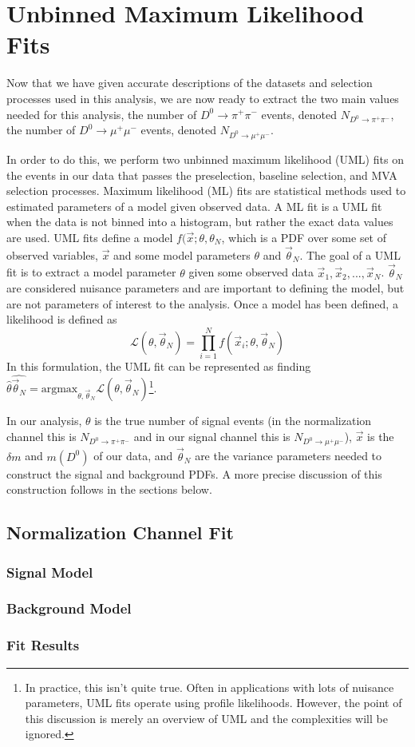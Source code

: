 \section{Unbinned Maximum Likelihood Fits}

Now that we have given accurate descriptions of the datasets and selection processes used in this analysis, we are now ready to extract the two main values needed for this analysis, the number of $D^0 \to \pi^+ \pi^-$ events, denoted $N_{D^0 \to \pi^+ \pi^-}$, the number of $D^0 \to \mu^+ \mu^-$ events, denoted $N_{D^0 \to \mu^+ \mu^-}$.

In order to do this, we perform two unbinned maximum likelihood (UML) fits on the events in our data that passes the preselection, baseline selection, and MVA selection processes. Maximum likelihood (ML) fits are statistical methods used to estimated parameters of a model given observed data. A ML fit is a UML fit when the data is not binned into a histogram, but rather the exact data values are used. UML fits define a model $f(\vec{x}; \theta, \theta_N$, which is a PDF over some set of observed variables, $\vec{x}$ and some model parameters $\theta$ and $\vec{\theta}_N$. The goal of a UML fit is to extract a model parameter $\theta$ given some observed data $\vec{x}_1, \vec{x}_2,...,\vec{x}_N$. $\vec{\theta}_N$ are considered nuisance parameters and are important to defining the model, but are not parameters of interest to the analysis. Once a model has been defined, a likelihood is defined as
\begin{equation}
    \mathcal{L}(\theta, \vec{\theta}_N) = \prod^N_{i=1} f(\vec{x}_i; \theta, \vec{\theta}_N)
\end{equation}
In this formulation, the UML fit can be represented as finding $\hat{\theta} \hat{\vec{\theta}_N}= \text{argmax}_{\theta, \vec{\theta}_N} \mathcal{L}(\theta, \vec{\theta}_N)$\footnote{In practice, this isn't quite true. Often in applications with lots of nuisance parameters, UML fits operate using profile likelihoods. However, the point of this discussion is merely an overview of UML and the complexities will be ignored.}. 

In our analysis, $\theta$ is the true number of signal events (in the normalization channel this is $N_{D^0 \to \pi^+ \pi^-}$ and in our signal channel this is $N_{D^0 \to \mu^+ \mu^-}$), $\vec{x}$ is the $\delta m$ and $m(D^0)$ of our data, and $\vec{\theta}_N$ are the variance parameters needed to construct the signal and background PDFs. A more precise discussion of this construction follows in the sections below. 

\subsection{Normalization Channel Fit}



\subsubsection{Signal Model}

\subsubsection{Background Model}

\subsubsection{Fit Results}

